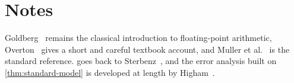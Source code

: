 \section*{Notes}

Goldberg~\cite{goldberg1991} remains the classical introduction to floating-point arithmetic, Overton~\cite{overton2001} gives a short and careful textbook account, and Muller et al.~\cite{muller2018handbook} is the standard reference.  goes back to Sterbenz~\cite{sterbenz1974}, and the error analysis built on \cref{thm:standard-model} is developed at length by Higham~\cite{higham2002accuracy}.

\chapterreferences
